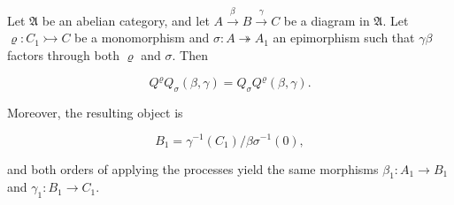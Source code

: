Let $\mathfrak{A}$ be an abelian category, and let $A \xrightarrow{\beta} B \xrightarrow{\gamma} C$ be a diagram in $\mathfrak{A}$. Let $\varrho: C_1 \rightarrowtail C$ be a monomorphism and $\sigma: A \twoheadrightarrow A_1$ an epimorphism such that $\gamma\beta$ factors through both $\varrho$ and $\sigma$. Then

$$Q^{\varrho}Q_{\sigma}(\beta, \gamma) = Q_{\sigma}Q^{\varrho}(\beta, \gamma).$$

Moreover, the resulting object is

$$B_1 = \gamma^{-1}(C_1) / \beta\sigma^{-1}(0),$$

and both orders of applying the processes yield the same morphisms $\beta_1: A_1 \to B_1$ and $\gamma_1: B_1 \to C_1$.
